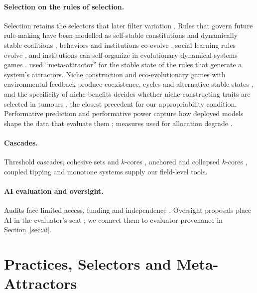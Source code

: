 \documentclass[letterpaper]{article} %
\theoremstyle{definition}
\begin{document}
\paragraph{Selection on the rules of selection.} Selection retains the selectors that later filter variation \citep{campbell1974}. Rules that govern future rule-making have been modelled as self-stable constitutions and dynamically stable coalitions \citep{barbera2004,acemoglu2012}, behaviors and institutions co-evolve \citep{bowles2003}, social learning rules evolve \citep{kendal2009}, and institutions can self-organize in evolutionary dynamical-systems games \citep{itao2025}. \citet{kluver2002} used ``meta-attractor'' for the stable state of the rules that generate a system's attractors. Niche construction and eco-evolutionary games with environmental feedback produce coexistence, cycles and alternative stable states \citep{laland1999,odlingsmee2003,weitz2016,tilman2020,ito2024}, and the specificity of niche benefits decides whether niche-constructing traits are selected in tumours \citep{gerlee2015}, the closest precedent for our appropriability condition. Performative prediction and performative power capture how deployed models shape the data that evaluate them \citep{perdomo2020,hardt2022,krueger2020}; measures used for allocation degrade \citep{campbell1979,manheim2018,smaldino2016}.

\paragraph{Cascades.} Threshold cascades, cohesive sets and $k$-cores \citep{granovetter1978,watts2002,morris2000,kempe2003,seidman1983}, anchored and collapsed $k$-cores \citep{bhawalkar2015,zhang2017collapsed}, coupled tipping \citep{brummitt2015} and monotone systems \citep{hirsch1985,smith1995} supply our field-level tools.

\paragraph{AI evaluation and oversight.} Audits face limited access, funding and independence \citep{raji2022,costanzachock2022,birhane2024}. Oversight proposals place AI in the evaluator's seat \citep{irving2018,christiano2018,leike2018,bai2022,burns2024,greenblatt2024}; we connect them to evaluator provenance in Section~\ref{sec:ai}.

\section{Practices, Selectors and Meta-Attractors}\label{sec:framework}
\end{document}
